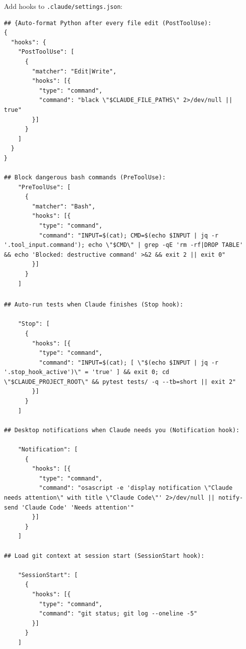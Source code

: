 \begin{frame}[fragile]\frametitle{}
Add hooks to \texttt{.claude/settings.json}:

\begin{lstlisting}
## {Auto-format Python after every file edit (PostToolUse):
{
  "hooks": {
    "PostToolUse": [
      {
        "matcher": "Edit|Write",
        "hooks": [{
          "type": "command",
          "command": "black \"$CLAUDE_FILE_PATHS\" 2>/dev/null || true"
        }]
      }
    ]
  }
}

## Block dangerous bash commands (PreToolUse):
    "PreToolUse": [
      {
        "matcher": "Bash",
        "hooks": [{
          "type": "command",
          "command": "INPUT=$(cat); CMD=$(echo $INPUT | jq -r '.tool_input.command'); echo \"$CMD\" | grep -qE 'rm -rf|DROP TABLE' && echo 'Blocked: destructive command' >&2 && exit 2 || exit 0"
        }]
      }
    ]
\end{lstlisting}
\end{frame}


\begin{frame}[fragile]\frametitle{}
\begin{lstlisting}
## Auto-run tests when Claude finishes (Stop hook):

    "Stop": [
      {
        "hooks": [{
          "type": "command",
          "command": "INPUT=$(cat); [ \"$(echo $INPUT | jq -r '.stop_hook_active')\" = 'true' ] && exit 0; cd \"$CLAUDE_PROJECT_ROOT\" && pytest tests/ -q --tb=short || exit 2"
        }]
      }
    ]

## Desktop notifications when Claude needs you (Notification hook):

    "Notification": [
      {
        "hooks": [{
          "type": "command",
          "command": "osascript -e 'display notification \"Claude needs attention\" with title \"Claude Code\"' 2>/dev/null || notify-send 'Claude Code' 'Needs attention'"
        }]
      }
    ]

## Load git context at session start (SessionStart hook):

    "SessionStart": [
      {
        "hooks": [{
          "type": "command",
          "command": "git status; git log --oneline -5"
        }]
      }
    ]
\end{lstlisting}
\end{frame}


